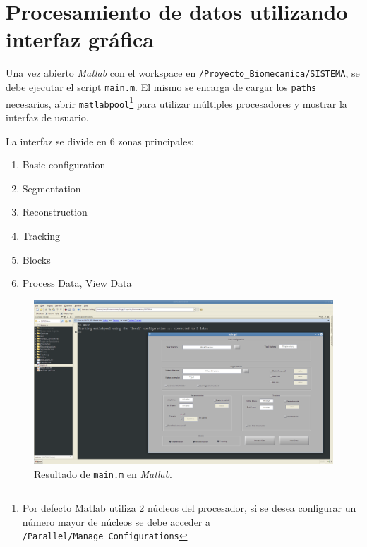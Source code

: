  \section{Procesamiento de datos utilizando interfaz gráfica}
 
 Una vez abierto \textit{Matlab} con el workspace en \texttt{/Proyecto\_Biomecanica/SISTEMA}, se debe ejecutar el script \texttt{main.m}. El mismo se encarga de cargar los \texttt{paths} necesarios, abrir \texttt{matlabpool}\footnote{Por defecto Matlab utiliza 2 núcleos del procesador, si se desea configurar un número mayor de núcleos se debe acceder a \texttt{/Parallel/Manage\_Configurations} } para utilizar múltiples procesadores y mostrar la interfaz de usuario.
 
 
 La interfaz se divide en 6 zonas principales:
 \begin{enumerate}
 \item Basic configuration
 \item Segmentation
 \item Reconstruction
 \item Tracking
 \item Blocks
 \item Process Data, View Data
 \end{enumerate}
 
 \begin{figure}[ht!]
 \hspace{-1cm}
 \includegraphics[scale=0.23]{img/Manual_de_usuario/main.png}
 \caption{Resultado de \texttt{main.m} en \textit{Matlab}.}
 \label{fig:main.m}
 \end{figure}
 
